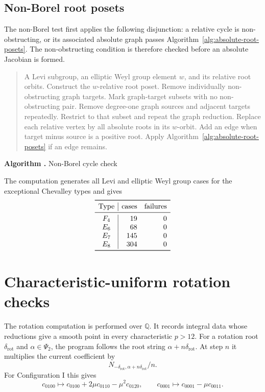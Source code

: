 \documentclass[11pt]{amsart}
\newcommand{\Q}{\mathbb Q}
\newcommand{\rot}{\mathrm{rot}}
\newcommand{\algorithmcaption}[2]{%
  \refstepcounter{figure}\label{#2}%
  \begin{center}\small\textbf{Algorithm \thefigure.} #1\end{center}}
\begin{document}
\subsection{Non-Borel root posets}

The non-Borel test first applies the following disjunction: a relative cycle is
non-obstructing, or its associated absolute graph passes
Algorithm~\ref{alg:absolute-root-posets}.  The non-obstructing condition is
therefore checked before an absolute Jacobian is formed.

\begin{quote}
\begin{algorithmic}[1]
\Require A Levi subgroup, an elliptic Weyl group element $w$, and its relative root orbits.
\State Construct the $w$-relative root poset.
\State Remove individually non-obstructing graph targets.
\State Mark graph-target subsets with no non-obstructing pair.
  \State Remove degree-one graph sources and adjacent targets repeatedly.
    \State Restrict to that subset and repeat the graph reduction.
    \State Replace each relative vertex by all absolute roots in its $w$-orbit.
    \State Add an edge when target minus source is a positive root.
    \State Apply Algorithm~\ref{alg:absolute-root-posets} if an edge remains.
  \EndFor
\EndFor
\end{algorithmic}
\end{quote}
\algorithmcaption{Non-Borel cycle check}{alg:non-borel}

The computation generates all Levi and elliptic Weyl group cases for the
exceptional Chevalley types and gives
\[
\begin{array}{c|rr}
\toprule
\text{Type}&\text{cases}&\text{failures}\\
\midrule
F_4&19&0\\
E_6&68&0\\
E_7&145&0\\
E_8&304&0\\
\bottomrule
\end{array}
\]

\section{Characteristic-uniform rotation checks}
\label{sec:rotation}

The rotation computation is performed over $\Q$.  It records integral data
whose reductions give a smooth point in every characteristic $p>12$.
For a rotation root $\delta_{\rot}$ and $\alpha\in\Psi_2$, the program follows
the root string $\alpha+n\delta_{\rot}$.  At step $n$ it multiplies the current
coefficient by
\[
N_{-\delta_{\rot},\alpha+n\delta_{\rot}}/n.
\]
For Configuration I this gives
\[
c_{0100}\longmapsto c_{0100}+2\mu c_{0110}-\mu^2c_{0120},\qquad
c_{0001}\longmapsto c_{0001}-\mu c_{0011}.
\]
\end{document}
